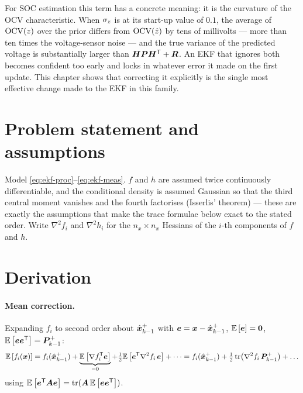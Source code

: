 For SOC estimation this term has a concrete meaning: it is the curvature of the OCV
characteristic. When $\sigma_z$ is at its start-up value of $0.1$, the average of
$\mathrm{OCV}(z)$ over the prior differs from $\mathrm{OCV}(\hat{z})$ by tens of millivolts --- more
than ten times the voltage-sensor noise --- and the true variance of the predicted voltage is
substantially larger than $\bm{H}\bm{P}\bm{H}^{\mathsf{T}}+\bm{R}$. An EKF that ignores both becomes confident too
early and locks in whatever error it made on the first update. This chapter shows that
correcting it explicitly is the single most effective change made to the EKF in this family.

\section{Problem statement and assumptions}
Model \eqref{eq:ekf-proc}--\eqref{eq:ekf-meas}. $f$ and $h$ are assumed twice continuously
differentiable, and the conditional density is assumed Gaussian so that the third central
moment vanishes and the fourth factorises (Isserlis' theorem) --- these are exactly the
assumptions that make the trace formulae below exact to the stated order. Write
$\nabla^2 f_i$ and $\nabla^2 h_i$ for the $n_x\times n_x$ Hessians of the $i$-th components
of $f$ and $h$.

\section{Derivation}
\paragraph{Mean correction.} Expanding $f_i$ to second order about $\hat{\bm{x}}^{+}_{k-1}$ with
$\bm{e} = \bm{x} - \hat{\bm{x}}^{+}_{k-1}$, $\mathbb{E}\left[\bm e\right]=\bm0$, $\mathbb{E}\left[\bm e\bm e^{\mathsf{T}}\right]=\bm{P}^{+}_{k-1}$:
\begin{equation}
\E{f_i(\vx)} = f_i(\xplus_{k-1}) + \underbrace{\E{\nabla f_i^\T\bm e}}_{=0}
 + \tfrac12\E{\bm e^\T\nabla^2f_i\,\bm e} + \dots
 = f_i(\xplus_{k-1}) + \tfrac12\tr\!\left(\nabla^2f_i\,\Pplus_{k-1}\right) + \dots
\label{eq:soekf-mean}
\end{equation}
using $\mathbb{E}\left[\bm e^{\mathsf{T}}\bm{A}\bm e\right] = \operatorname{tr}(\bm{A}\,\mathbb{E}\left[\bm e\bm e^{\mathsf{T}}\right])$.

